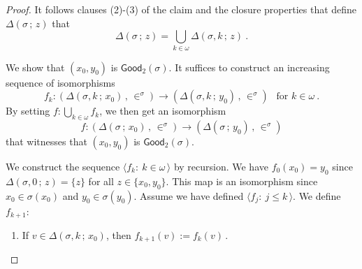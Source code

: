 \documentclass[10pt,a4paper, openany,  oldfontcommands]{memoir}
\newtheorem{open problem} [theorem] {Open Problem}
\begin{document}
\begin{proof}
It follows clauses (2)-(3) of the  claim   and the closure properties that define    $      \Delta \left(  \sigma   \,  ;   \,   z  \right)   $  that 
\[
  \Delta \left(  \sigma   \,  ;   \,   z  \right)    =  \bigcup_{  k  \in  \omega  }      \Delta \left(  \sigma , k  \,  ;   \,   z  \right)   
  \       . 
\]






We show that    $  (x_0,  y_0)  $  is     $  \mathsf{Good}_2  \left(  \sigma \right) $.
It suffices to construct an increasing sequence  of isomorphisms 
\[
f_k  :    \left(   \Delta \left(  \sigma , k  \,  ;   \,   x_0   \right)    \,  ,  \,   \in^{  \sigma }   \right)  
   \to  
   \left(     \Delta \left(  \sigma , k  \,  ;   \,   y_0  \right)       \,  ,  \,   \in^{  \sigma }   \right)  
\     \    \mbox{  for  }  k  \in  \omega 
\     .
\]
By setting  $  f  :   \bigcup_{  k   \in   \omega }    f_k $,  we then get an isomorphism 
\[
f  :    \left(   \Delta \left(  \sigma   \,  ;   \,   x_0   \right)    \,  ,  \,   \in^{  \sigma }   \right)  
   \to  
   \left(     \Delta \left(  \sigma   \,  ;   \,   y_0  \right)       \,  ,  \,   \in^{  \sigma }   \right)  
\]
that witnesses that    $  (x_0,  y_0)  $  is     $  \mathsf{Good}_2  \left(  \sigma \right)  $. 





We construct the sequence    $  \langle f_k  :   \   k  \in  \omega   \,  \rangle  $  by recursion. 
We have  $  f_0  \left(  x_0  \right)   = y_0 $  since 
 $    \Delta \left(  \sigma , 0  \,  ;   \,   z   \right)    =  \lbrace  z  \rbrace  $  for all $  z  \in  \lbrace x_0,  y_0  \rbrace  $. 
This map is an isomorphism since   $  x_0  \in  \sigma \left(  x_0  \right)   $  and    $  y_0  \in   \sigma \left(  y_0  \right)   $.
Assume we have defined  $  \langle f_j  :   \    j  \leq  k    \,  \rangle  $. 
We define  $  f_{ k+1}  $: 
\begin{enumerate}
\item  If   $   v  \in    \Delta \left(  \sigma , k  \,  ;   \,   x_0   \right)    $, then 
$  f_{ k+1}  \left( v  \right)    :=    f_k (v)        \,   $. 




\end{enumerate}
\end{proof}
\end{document}
